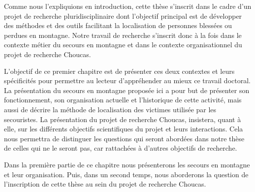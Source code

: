 Comme nous l'expliquions en introduction, cette thèse s'inscrit dans
le cadre d'un projet de recherche pluridisciplinaire dont l'objectif
principal est de développer des méthodes et des outils facilitant la
localisation de personnes blessées ou perdues en montagne. Notre
travail de recherche s'inscrit donc à la fois dans le contexte métier
du secours en montagne et dans le contexte organisationnel du projet
de recherche Choucas.

L'objectif de ce premier chapitre est de présenter ces deux contextes
et leurs spécificités pour permettre au lecteur d'appréhender au mieux
ce travail doctoral. La présentation du secours en montagne proposée
ici a pour but de présenter son fonctionnement, son organisation
actuelle et l'historique de cette activité, mais aussi de décrire la
méthode de localisation des victimes utilisée par les secouristes. La
présentation du projet de recherche Choucas, insistera, quant à elle,
sur les différents objectifs scientifiques du projet et leurs
interactions. Cela nous permettra de distinguer les questions qui
seront abordées dans notre thèse de celles qui ne le seront pas, car
rattachées à d'autres objectifs de recherche.

Dans la première partie de ce chapitre nous présenterons les secours
en montagne et leur organisation. Puis, dans un second temps, nous
aborderons la question de l'inscription de cette thèse au sein du
projet de recherche Choucas.

